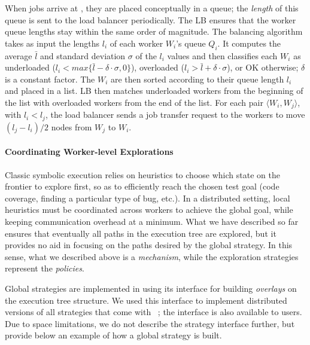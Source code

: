 When jobs arrive at \wdst, they are placed conceptually in a queue; the \emph{length} of this queue is sent to the load balancer periodically.  The LB ensures that the worker queue lengths stay within the same order of magnitude.  The balancing algorithm takes as input the lengths $l_i$ of each worker $W_i$'s queue $Q_i$.  It computes the average $\bar{l}$ and standard deviation $\sigma$ of the $l_i$ values and then classifies each $W_i$ as underloaded ($l_i < max \{ \bar{l}-\delta \cdot \sigma, 0 \}$), overloaded ($l_i > \bar{l} + \delta \cdot \sigma$), or OK otherwise; $\delta$ is a constant factor.  The $W_i$ are then sorted according to their queue length $l_i$ and placed in a list.  LB then matches underloaded workers from the beginning of the list with overloaded workers from the end of the list.  For each pair $\langle W_i,W_j \rangle$, with $l_i < l_j$, the load balancer sends a job transfer request to the workers to  move $(l_j - l_i)/2$ \candidate nodes from $W_j$ to $W_i$.


\paragraph{Coordinating Worker-level Explorations}
\label{sec:globalStrategy}

Classic symbolic execution relies on heuristics to choose which state on the frontier to explore first, so as to efficiently reach the chosen test goal (code coverage, finding a particular type of bug, etc.). In a distributed setting, local heuristics must be coordinated across workers to achieve the global goal, while keeping communication overhead at a minimum. What we have described so far ensures that eventually all paths in the execution tree are explored, but it provides no aid in focusing on the paths desired by the global strategy.  In this sense, what we described above is a \emph{mechanism}, while the exploration strategies represent the \emph{policies}.

Global strategies are implemented in \cnine using its interface for building {\em overlays} on the execution tree structure.  We used this interface to implement distributed versions of all strategies that come with \klee~\cite{klee}; the interface is also available to \cnine users.  Due to space limitations, we do not describe the strategy interface further, but provide below an example of how a global strategy is built.

